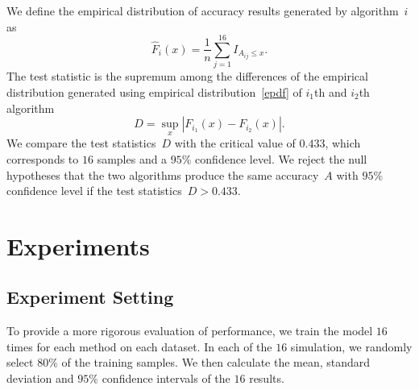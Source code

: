 \documentclass[12pt]{article} %
\begin{document}
We define the empirical distribution of accuracy results generated by algorithm~$i$ as
\begin{equation}\label{epdf}
  \hat{F}_{i}(x)=\frac{1}{n}\sum_{j=1}^{16}I_{A_{ij} \leq x}.
\end{equation}
The test statistic is the supremum among the differences of the empirical distribution generated using empirical distribution~\eqref{epdf} of $i_1$th and $i_2$th algorithm \citep{Walck:1996cca}
\begin{equation}\label{teststatistic}
D=\sup _{x}\left|F_{i_1}(x)-F_{i_2}(x)\right|.
\end{equation}
We compare the test statistics~$D$ with the critical value of $0.433$, which corresponds to $16$ samples and a $95\%$ confidence level. We reject the null hypotheses that the two algorithms produce the same accuracy~$A$ with $95\%$ confidence level if the test statistics~$D>0.433$.
\section{Experiments}\label{result}
\subsection{Experiment Setting}
To provide a more rigorous evaluation of performance, we train the model $16$ times for each method on each dataset. In each of the $16$ simulation, we randomly select $80\%$ of the training samples. We then calculate the mean, standard deviation and $95\%$ confidence intervals of the $16$ results.
\end{document}
